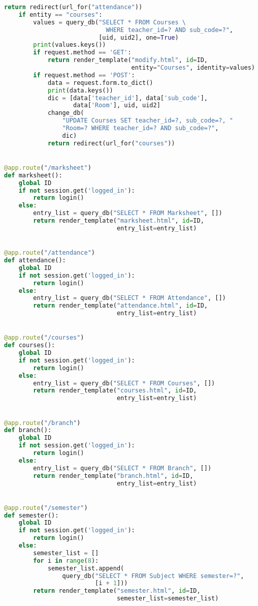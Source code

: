 \begin{lstlisting}[language=python]
            return redirect(url_for("attendance"))
    if entity == "courses":
        values = query_db("SELECT * FROM Courses \
                            WHERE teacher_id=? AND sub_code=?",
                          [uid, uid2], one=True)
        print(values.keys())
        if request.method == 'GET':
            return render_template("modify.html", id=ID,
                                   entity="Courses", identity=values)
        if request.method == 'POST':
            data = request.form.to_dict()
            print(data.keys())
            dic = [data['teacher_id'], data['sub_code'],
                   data['Room'], uid, uid2]
            change_db(
                "UPDATE Courses SET teacher_id=?, sub_code=?, "
                "Room=? WHERE teacher_id=? AND sub_code=?",
                dic)
            return redirect(url_for("courses"))


@app.route("/marksheet")
def marksheet():
    global ID
    if not session.get('logged_in'):
        return login()
    else:
        entry_list = query_db("SELECT * FROM Marksheet", [])
        return render_template("marksheet.html", id=ID,
                               entry_list=entry_list)


@app.route("/attendance")
def attendance():
    global ID
    if not session.get('logged_in'):
        return login()
    else:
        entry_list = query_db("SELECT * FROM Attendance", [])
        return render_template("attendance.html", id=ID,
                               entry_list=entry_list)


@app.route("/courses")
def courses():
    global ID
    if not session.get('logged_in'):
        return login()
    else:
        entry_list = query_db("SELECT * FROM Courses", [])
        return render_template("courses.html", id=ID,
                               entry_list=entry_list)


@app.route("/branch")
def branch():
    global ID
    if not session.get('logged_in'):
        return login()
    else:
        entry_list = query_db("SELECT * FROM Branch", [])
        return render_template("branch.html", id=ID,
                               entry_list=entry_list)


@app.route("/semester")
def semester():
    global ID
    if not session.get('logged_in'):
        return login()
    else:
        semester_list = []
        for i in range(8):
            semester_list.append(
                query_db("SELECT * FROM Subject WHERE semester=?",
                         [i + 1]))
        return render_template("semester.html", id=ID,
                               semester_list=semester_list)



\end{lstlisting}
